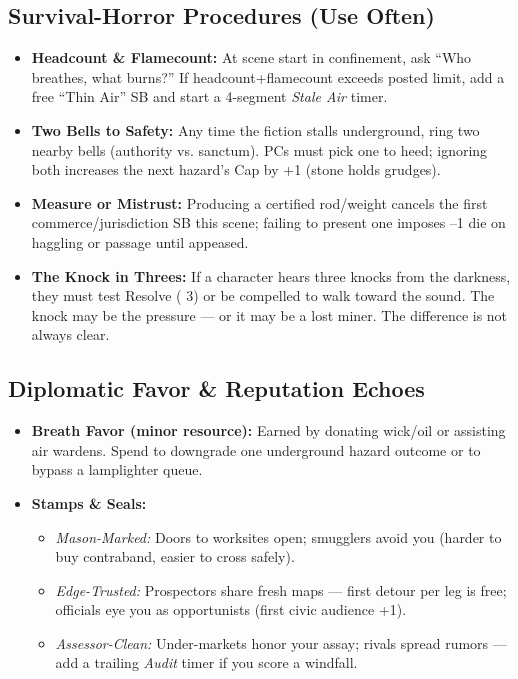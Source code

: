 \subsection*{Survival-Horror Procedures (Use Often)}
\begin{itemize}
  \item \textbf{Headcount \& Flamecount:} At scene start in confinement, ask ``Who breathes, what burns?'' If headcount+flamecount exceeds posted limit, add a free ``Thin Air'' SB and start a 4-segment \emph{Stale Air} timer.
  \item \textbf{Two Bells to Safety:} Any time the fiction stalls underground, ring two nearby bells (authority vs. sanctum). PCs must pick one to heed; ignoring both increases the next hazard's Cap by +1 (stone holds grudges).
  \item \textbf{Measure or Mistrust:} Producing a certified rod/weight cancels the first commerce/jurisdiction SB this scene; failing to present one imposes --1 die on haggling or passage until appeased.
  \item \textbf{The Knock in Threes:} If a character hears three knocks from the darkness, they must test Resolve (\DV{} 3) or be compelled to walk toward the sound. The knock may be the pressure --- or it may be a lost miner. The difference is not always clear.
\end{itemize}

\subsection*{Diplomatic Favor \& Reputation Echoes}
\begin{itemize}
  \item \textbf{Breath Favor (minor resource):} Earned by donating wick/oil or assisting air wardens. Spend to downgrade one underground hazard outcome or to bypass a lamplighter queue.
  \item \textbf{Stamps \& Seals:}
    \begin{itemize}
      \item \emph{Mason-Marked:} Doors to worksites open; smugglers avoid you (harder to buy contraband, easier to cross safely).
      \item \emph{Edge-Trusted:} Prospectors share fresh maps --- first detour per leg is free; officials eye you as opportunists (first civic audience \DV{} +1).
      \item \emph{Assessor-Clean:} Under-markets honor your assay; rivals spread rumors --- add a trailing \emph{Audit} timer if you score a windfall.
    \end{itemize}
\end{itemize}

